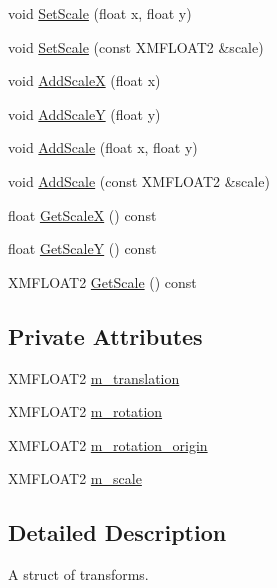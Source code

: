 \begin{DoxyCompactItemize}
\item 
void \hyperlink{structmage_1_1_sprite_transform_abc9fdab6e961508423befabd0648dab6}{Set\+Scale} (float x, float y)
\item 
void \hyperlink{structmage_1_1_sprite_transform_a24008167674c9fb524c48214e6893c1d}{Set\+Scale} (const X\+M\+F\+L\+O\+A\+T2 \&scale)
\item 
void \hyperlink{structmage_1_1_sprite_transform_aff82cf6bde45535de538fe93cf99d4c5}{Add\+ScaleX} (float x)
\item 
void \hyperlink{structmage_1_1_sprite_transform_a8cc05bfa72d615c99fc5c3cfcef8e096}{Add\+ScaleY} (float y)
\item 
void \hyperlink{structmage_1_1_sprite_transform_a4e260b9085f2609523979a7a0446c748}{Add\+Scale} (float x, float y)
\item 
void \hyperlink{structmage_1_1_sprite_transform_a2310f5a1d31bc6a42b5f1e6e0490f5f6}{Add\+Scale} (const X\+M\+F\+L\+O\+A\+T2 \&scale)
\item 
float \hyperlink{structmage_1_1_sprite_transform_ae192203af55097b4e296ce0cb916cd97}{Get\+ScaleX} () const
\item 
float \hyperlink{structmage_1_1_sprite_transform_ad25f6881510e258a5afb00ae9ad7bc87}{Get\+ScaleY} () const
\item 
X\+M\+F\+L\+O\+A\+T2 \hyperlink{structmage_1_1_sprite_transform_ab9a7dcdbf3013960942ff98df313a92d}{Get\+Scale} () const
\end{DoxyCompactItemize}
\subsection*{Private Attributes}
\begin{DoxyCompactItemize}
\item 
X\+M\+F\+L\+O\+A\+T2 \hyperlink{structmage_1_1_sprite_transform_a7642907ec8ae9685bb7c56675607045b}{m\+\_\+translation}
\item 
X\+M\+F\+L\+O\+A\+T2 \hyperlink{structmage_1_1_sprite_transform_ae728a69c8b693c4129dbe93dec95687a}{m\+\_\+rotation}
\item 
X\+M\+F\+L\+O\+A\+T2 \hyperlink{structmage_1_1_sprite_transform_ae51ebd0226ef4b569b6a66884823bd18}{m\+\_\+rotation\+\_\+origin}
\item 
X\+M\+F\+L\+O\+A\+T2 \hyperlink{structmage_1_1_sprite_transform_a7532d4d41d02b5fa6f31eeb4fd4fd886}{m\+\_\+scale}
\end{DoxyCompactItemize}


\subsection{Detailed Description}
A struct of transforms. 

